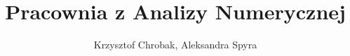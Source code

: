 \documentclass[12pt,oneside, notitlepage]{article}
\numberwithin{figure}{section}
\numberwithin{table}{section}
\begin{document}
\title{Pracownia z Analizy Numerycznej}
\author{Krzysztof Chrobak, Aleksandra Spyra}
\maketitle
\tableofcontents






\end{document}
